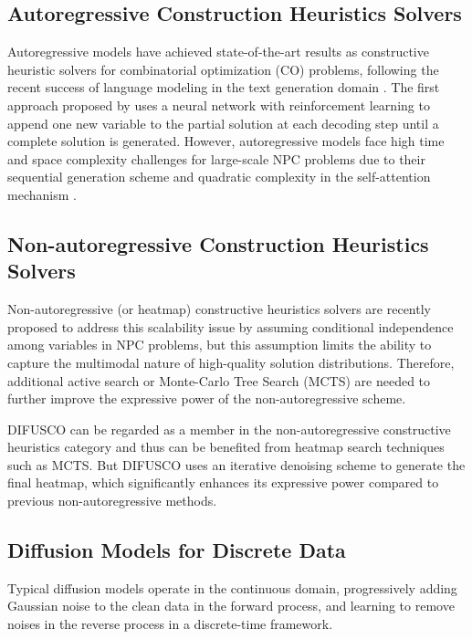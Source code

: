 \documentclass{article}
\theoremstyle{plain}
\theoremstyle{definition}
\theoremstyle{remark}
\newcommand{\method}{DIFUSCO}
\begin{document}
\subsection{Autoregressive Construction Heuristics Solvers}



Autoregressive models have achieved state-of-the-art results as constructive heuristic solvers for combinatorial optimization (CO) problems, following %
the recent success of
language modeling in the text generation domain \citep{vaswani2017attention,brown2020language}. The 
first approach proposed by \citet{bello2016neural} %
uses a neural network %
with reinforcement learning to append one new variable to the partial solution at each decoding step until a complete solution is generated. However, autoregressive models \citep{19iclr-am} face high time and space complexity challenges for large-scale NPC problems due to their sequential generation scheme and quadratic complexity in the self-attention mechanism \citep{vaswani2017attention}.

\subsection{Non-autoregressive Construction Heuristics Solvers}

Non-autoregressive (or heatmap) constructive heuristics solvers \citep{joshi2019efficient,fu2021generalize,geisler2022generalization,qiudimes} are recently proposed to address this scalability issue 
by assuming conditional independence among variables in NPC problems,
but this assumption limits the ability to capture the multimodal nature \citep{khalil2017learning,gu2018non} of high-quality solution distributions. Therefore, additional active search \citep{bello2016neural,qiudimes} or Monte-Carlo Tree Search (MCTS) \citep{fu2021generalize,silver2016mastering} are needed to further improve the expressive power of the non-autoregressive scheme.

\method{} can be regarded as %
a member in the non-autoregressive constructive heuristics category %
and thus can be benefited from heatmap search techniques such as MCTS. But \method{} uses an iterative denoising scheme to generate the final heatmap, which significantly enhances its expressive power compared to previous non-autoregressive methods.


\subsection{Diffusion Models for Discrete Data}
Typical diffusion models \citep{sohl2015deep,song2019generative,ho2020denoising,song2020improved,nichol2021improved,karras2022elucidating} operate in the continuous domain, progressively adding Gaussian noise to the clean data in the forward process, and learning to remove noises in the reverse process in a discrete-time framework.
\end{document}
